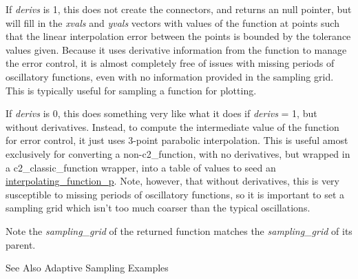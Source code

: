 If {\itshape derivs} is 1, this does not create the connectors, and returns an null pointer, but will fill in the {\itshape xvals} and {\itshape yvals} vectors with values of the function at points such that the linear interpolation error between the points is bounded by the tolerance values given. Because it uses derivative information from the function to manage the error control, it is almost completely free of issues with missing periods of oscillatory functions, even with no information provided in the sampling grid. This is typically useful for sampling a function for plotting.

If {\itshape derivs} is 0, this does something very like what it does if {\itshape derivs} = 1, but without derivatives. Instead, to compute the intermediate value of the function for error control, it just uses 3-\/point parabolic interpolation. This is useful amost exclusively for converting a non-\/c2\-\_\-function, with no derivatives, but wrapped in a c2\-\_\-classic\-\_\-function wrapper, into a table of values to seed an \hyperlink{classinterpolating__function__p}{interpolating\-\_\-function\-\_\-p}. Note, however, that without derivatives, this is very susceptible to missing periods of oscillatory functions, so it is important to set a sampling grid which isn't too much coarser than the typical oscillations.

\begin{DoxyNote}{Note}
the {\itshape sampling\-\_\-grid} of the returned function matches the {\itshape sampling\-\_\-grid} of its parent. 
\end{DoxyNote}
\begin{DoxySeeAlso}{See Also}
Adaptive Sampling Examples 
\end{DoxySeeAlso}

